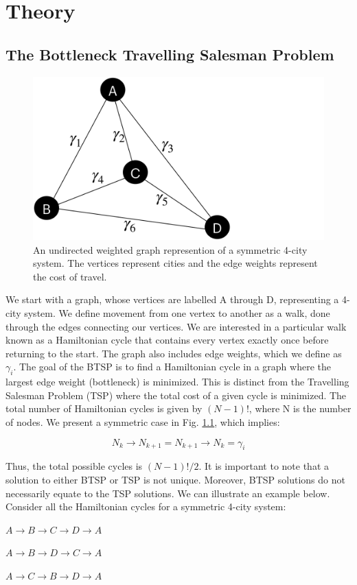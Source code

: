 \documentclass[msc,oneside]{ubcthesis}
\begin{document}
	\chapter{Theory}
	\section{The Bottleneck Travelling Salesman Problem}


\begin{figure}[!h]
	\centering
	\includegraphics[trim={0 0 21.9cm 0},clip, width=0.4 \linewidth]{"graphics/4-city"}
	\caption{An undirected weighted graph represention of a  symmetric 4-city system.  The vertices represent cities and the edge weights represent the cost of travel. }
	\label{fig:4-city-graphic}
\end{figure}		

We start with a graph, whose vertices are labelled A through D, representing a 4-city system. We define movement from one vertex to another as a walk, done through the edges connecting our vertices. We are interested in a particular walk known as a Hamiltonian cycle that contains every vertex exactly once before returning to the start. The graph also includes edge weights, which we define as $ \gamma_i $.
The goal of the BTSP is to find a Hamiltonian cycle in a graph where the largest edge weight (bottleneck) is minimized. This is distinct from the Travelling Salesman Problem (TSP) where the total cost of a given cycle is minimized. The total number of Hamiltonian cycles is given by $(N-1)!$, where N is the number of nodes. We present a symmetric case in Fig. \ref{fig:4-city-graphic}, which implies:

 $$N_k \rightarrow N_{k+1} = N_{k+1} \rightarrow N_{k} = \gamma_i$$
 
 Thus, the total possible cycles is  $(N-1)!/2$.  It is important to note that a solution to either BTSP or TSP is not unique. Moreover, BTSP solutions do not necessarily equate to the TSP solutions. We can illustrate an example below. Consider all the Hamiltonian cycles for a symmetric 4-city system:

\begin{center}
	$ A \rightarrow B \rightarrow C \rightarrow D \rightarrow A $
	
	$ A \rightarrow B \rightarrow D \rightarrow C \rightarrow A $ 
	
	$ A \rightarrow C \rightarrow B \rightarrow D \rightarrow A $
\end{center}
\end{document}
